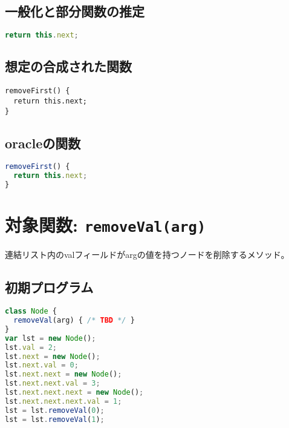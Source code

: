 \documentclass{article}
\begin{document}
\subsection{一般化と部分関数の推定}

\begin{lstlisting}[language=JavaScript]
return this.next;
\end{lstlisting}

\subsection{想定の合成された関数}
\begin{lstlisting}
removeFirst() {
  return this.next;
}
\end{lstlisting}

\subsection{oracleの関数}
\begin{lstlisting}[language=JavaScript]
removeFirst() {
  return this.next;
}
\end{lstlisting}









\section{対象関数: \texttt{removeVal(arg)}}
連結リスト内のvalフィールドがargの値を持つノードを削除するメソッド。

\subsection{初期プログラム}

\begin{lstlisting}[language=JavaScript]
class Node {
  removeVal(arg) { /* TBD */ }
}
var lst = new Node(); 
lst.val = 2;
lst.next = new Node();
lst.next.val = 0;
lst.next.next = new Node(); 
lst.next.next.val = 3;
lst.next.next.next = new Node(); 
lst.next.next.next.val = 1;
lst = lst.removeVal(0);
lst = lst.removeVal(1);
\end{lstlisting}
\end{document}
